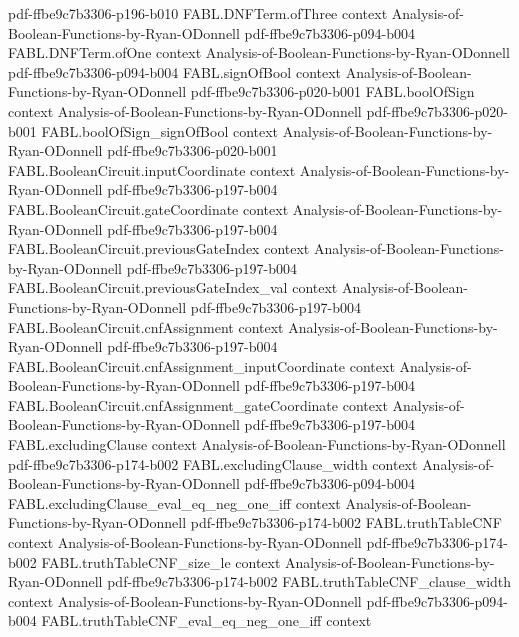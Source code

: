 \begin{theorem}
  {pdf-ffbe9c7b3306-p196-b010}
\proofstep
  {FABL.DNFTerm.ofThree}
  {context}
  {Analysis-of-Boolean-Functions-by-Ryan-ODonnell}
  {pdf-ffbe9c7b3306-p094-b004}
\proofstep
  {FABL.DNFTerm.ofOne}
  {context}
  {Analysis-of-Boolean-Functions-by-Ryan-ODonnell}
  {pdf-ffbe9c7b3306-p094-b004}
\proofstep
  {FABL.signOfBool}
  {context}
  {Analysis-of-Boolean-Functions-by-Ryan-ODonnell}
  {pdf-ffbe9c7b3306-p020-b001}
\proofstep
  {FABL.boolOfSign}
  {context}
  {Analysis-of-Boolean-Functions-by-Ryan-ODonnell}
  {pdf-ffbe9c7b3306-p020-b001}
\proofstep
  {FABL.boolOfSign_signOfBool}
  {context}
  {Analysis-of-Boolean-Functions-by-Ryan-ODonnell}
  {pdf-ffbe9c7b3306-p020-b001}
\proofstep
  {FABL.BooleanCircuit.inputCoordinate}
  {context}
  {Analysis-of-Boolean-Functions-by-Ryan-ODonnell}
  {pdf-ffbe9c7b3306-p197-b004}
\proofstep
  {FABL.BooleanCircuit.gateCoordinate}
  {context}
  {Analysis-of-Boolean-Functions-by-Ryan-ODonnell}
  {pdf-ffbe9c7b3306-p197-b004}
\proofstep
  {FABL.BooleanCircuit.previousGateIndex}
  {context}
  {Analysis-of-Boolean-Functions-by-Ryan-ODonnell}
  {pdf-ffbe9c7b3306-p197-b004}
\proofstep
  {FABL.BooleanCircuit.previousGateIndex_val}
  {context}
  {Analysis-of-Boolean-Functions-by-Ryan-ODonnell}
  {pdf-ffbe9c7b3306-p197-b004}
\proofstep
  {FABL.BooleanCircuit.cnfAssignment}
  {context}
  {Analysis-of-Boolean-Functions-by-Ryan-ODonnell}
  {pdf-ffbe9c7b3306-p197-b004}
\proofstep
  {FABL.BooleanCircuit.cnfAssignment_inputCoordinate}
  {context}
  {Analysis-of-Boolean-Functions-by-Ryan-ODonnell}
  {pdf-ffbe9c7b3306-p197-b004}
\proofstep
  {FABL.BooleanCircuit.cnfAssignment_gateCoordinate}
  {context}
  {Analysis-of-Boolean-Functions-by-Ryan-ODonnell}
  {pdf-ffbe9c7b3306-p197-b004}
\proofstep
  {FABL.excludingClause}
  {context}
  {Analysis-of-Boolean-Functions-by-Ryan-ODonnell}
  {pdf-ffbe9c7b3306-p174-b002}
\proofstep
  {FABL.excludingClause_width}
  {context}
  {Analysis-of-Boolean-Functions-by-Ryan-ODonnell}
  {pdf-ffbe9c7b3306-p094-b004}
\proofstep
  {FABL.excludingClause_eval_eq_neg_one_iff}
  {context}
  {Analysis-of-Boolean-Functions-by-Ryan-ODonnell}
  {pdf-ffbe9c7b3306-p174-b002}
\proofstep
  {FABL.truthTableCNF}
  {context}
  {Analysis-of-Boolean-Functions-by-Ryan-ODonnell}
  {pdf-ffbe9c7b3306-p174-b002}
\proofstep
  {FABL.truthTableCNF_size_le}
  {context}
  {Analysis-of-Boolean-Functions-by-Ryan-ODonnell}
  {pdf-ffbe9c7b3306-p174-b002}
\proofstep
  {FABL.truthTableCNF_clause_width}
  {context}
  {Analysis-of-Boolean-Functions-by-Ryan-ODonnell}
  {pdf-ffbe9c7b3306-p094-b004}
\proofstep
  {FABL.truthTableCNF_eval_eq_neg_one_iff}
  {context}

\end{theorem}
